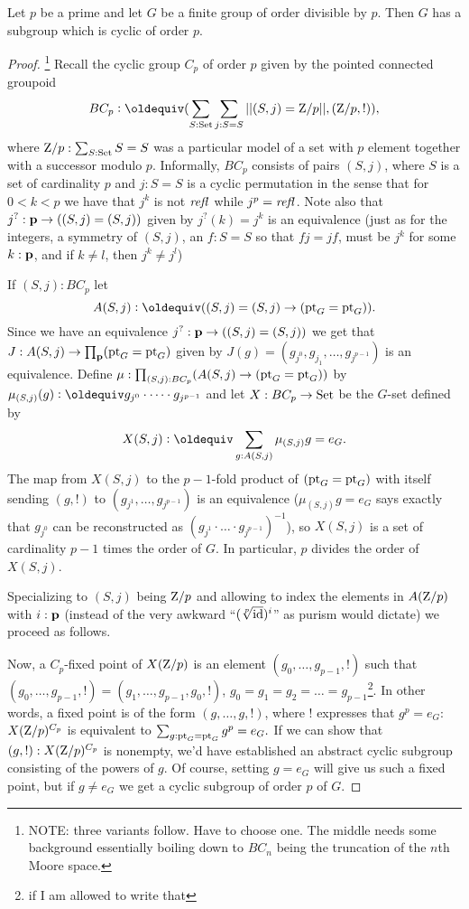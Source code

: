 \begin{theorem}
  \label{thm:cauchys}
  Let $p$ be a prime and let $G$ be a finite group of order divisible by $p$.  
Then $G$ has a subgroup which is cyclic of order $p$. 
\end{theorem}
\begin{proof}
\footnote{NOTE: three variants follow.  Have to choose one.  The middle needs some background essentially boiling down to $BC_n$ being the truncation of the $n$th Moore space.}
Recall the cyclic group $C_p$ of order $p$ given by the pointed connected groupoid
$$BC_p\defequi(\sum_{S:\Set}\sum_{j:S=S}||(S,j)=\zet/p||,(\zet/p,!)),
$$
 where $\mathrm{Z}/p:\sum_{S:\mathord{\mathrm{Set}}}S=S$ was a particular model of a set with $p$ element together with a successor modulo $p$.  Informally, $BC_p$ consists of pairs $(S,j)$, where $S$ is a set of cardinality $p$ and $j:S=S$ is a cyclic permutation in the sense that for $0<k<p$ we have that $j^k$ is not $\mathop{{\it refl}_{}}$ while $j^p=\mathop{{\it refl}_{}}$.  Note also that $j^?:\mathbf{p}\to ((S,j)=(S,j))$ given by $j^?(k)=j^k$ is an equivalence (just as for the integers, a symmetry of $(S,j)$, \ie an $f:S=S$ so that $fj=jf$, must be $j^k$ for some $k:\mathbf{p}$, and if $k\neq l$, then $j^k\neq j^l$)

If $(S,j):BC_p$ let 
$$A(S,j)\defequi ((S,j)=(S,j)\to (\pt_G=\pt_G)).$$  Since we have an equivalence $j^?:\mathbf{p}\to ((S,j)=(S,j))$ we get that $J:A(S,j)\to \prod_{\mathbf{p}}({\mathord{\mathrm{pt}}}_G={\mathord{\mathrm{pt}}}_G)$ given by $J(g)=(g_{j^0},g_{j_1},\dots,g_{j^{p-1}})$ is an equivalence.  Define $\mu:\prod_{(S,j):BC_p}(A(S,j)\to({\mathord{\mathrm{pt}}}_G={\mathord{\mathrm{pt}}}_G))$ by $\mu_{(S,j)}(g)\defequi g_{j^0}\cdot\dots\cdot g_{j^{p-1}}$ and let $X:BC_p\to\mathord{\mathrm{Set}}$ be the $G$-set defined by  
$$X(S,j)\defequi\sum_{g:A(S,j)}\mu_{(S,j)}g=e_G.$$ 
The map from $X(S,j)$ to the $p-1$-fold product of $({\mathord{\mathrm{pt}}}_G={\mathord{\mathrm{pt}}}_G)$ with itself sending $(g,!)$ to $(g_{j^1},\dots,g_{j^{p-1}})$ is an equivalence ($\mu_{(S,j)}g=e_G$ says exactly that $g_{j^0}$ can be reconstructed as $(g_{j^1}\cdot\dots\cdot g_{j^{p-1}})^{-1}$), so $X(S,j)$ is a set of cardinality $p-1$ times the order of $G$.  In particular, $p$ divides the order of $X(S,j)$.

Specializing to $(S,j)$ being $\mathrm{Z}/p$ and allowing to index the elements in $A(\mathrm{Z}/p)$ with $i:\mathbf{p}$ (instead of the very awkward ``$(\sqrt[p]{\mathord{\mathrm{id}}})^i$'' as purism would dictate) we proceed as follows.

Now, a $C_p$-fixed point of $X(\mathrm{Z}/p)$ is an element $(g_0,\dots,g_{p-1},!)$ such that $(g_0,\dots,g_{p-1},!)=(g_1,\dots,g_{p-1},g_0,!)$, \ie $g_0=g_1=g_2=\dots=g_{p-1}$\footnote{if I am allowed to write that}.  In other words, a fixed point is of the form $(g,\dots,g,!)$, where $!$ expresses that $g^p=e_G$:
$X(\mathrm{Z}/p)^{C_p}$ is equivalent to $\sum_{g:{\mathord{\mathrm{pt}}}_G={\mathord{\mathrm{pt}}}_G}g^p=e_G.$  If we can show that $(g,!):X(\mathrm{Z}/p)^{C_p}$ is nonempty, we'd have established an abstract cyclic subgroup consisting of the powers of $g$.  Of course, setting $g=e_G$ will give us such a fixed point, but if $g\neq e_G$ we get a cyclic subgroup of order $p$ of $G$.


\end{proof}
